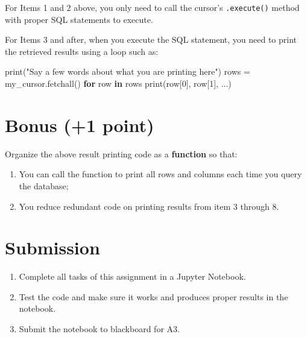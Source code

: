 \documentclass[
  letterpaper,
]{scrbook}
\newenvironment{Shaded}{\begin{snugshade}}{\end{snugshade}}
\newcommand{\BuiltInTok}[1]{\textcolor[rgb]{0.00,0.23,0.31}{#1}}
\newcommand{\ControlFlowTok}[1]{\textcolor[rgb]{0.00,0.23,0.31}{\textbf{#1}}}
\newcommand{\DecValTok}[1]{\textcolor[rgb]{0.68,0.00,0.00}{#1}}
\newcommand{\KeywordTok}[1]{\textcolor[rgb]{0.00,0.23,0.31}{\textbf{#1}}}
\newcommand{\NormalTok}[1]{\textcolor[rgb]{0.00,0.23,0.31}{#1}}
\newcommand{\OperatorTok}[1]{\textcolor[rgb]{0.37,0.37,0.37}{#1}}
\newcommand{\StringTok}[1]{\textcolor[rgb]{0.13,0.47,0.30}{#1}}
\providecommand{\tightlist}{%
  \setlength{\itemsep}{0pt}\setlength{\parskip}{0pt}}
\begin{document}
For Items 1 and 2 above, you only need to call the cursor's
\texttt{.execute()} method with proper SQL statements to execute.

For Items 3 and after, when you execute the SQL statement, you need to
print the retrieved results using a loop such as:

\begin{Shaded}
\begin{Highlighting}[]
\BuiltInTok{print}\NormalTok{(}\StringTok{"Say a few words about what you are printing here"}\NormalTok{)}
\NormalTok{rows }\OperatorTok{=}\NormalTok{ my\_cursor.fetchall()}
\ControlFlowTok{for}\NormalTok{ row }\KeywordTok{in}\NormalTok{ rows}
    \BuiltInTok{print}\NormalTok{(row[}\DecValTok{0}\NormalTok{], row[}\DecValTok{1}\NormalTok{], ...)}
\end{Highlighting}
\end{Shaded}

\section*{Bonus (+1 point)}\label{bonus-1-point-1}


Organize the above result printing code as a \textbf{function} so that:

\begin{enumerate}
\def\labelenumi{\arabic{enumi})}
\item
  You can call the function to print all rows and columns each time you
  query the database;
\item
  You reduce redundant code on printing results from item 3 through 8.
\end{enumerate}

\section*{Submission}\label{submission-1}


\begin{enumerate}
\def\labelenumi{\arabic{enumi}.}
\tightlist
\item
  Complete all tasks of this assignment in a Jupyter Notebook.
\item
  Test the code and make sure it works and produces proper results in
  the notebook.
\item
  Submit the notebook to blackboard for A3.
\end{enumerate}
\end{document}
